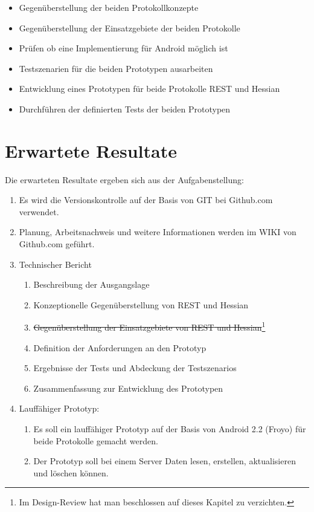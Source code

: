 \documentclass[abstracton, listof=totocnumbered,
bibliography=totocnumbered]{scrreprt}
\begin{document}
  \begin{itemize}
    \item Gegenüberstellung der beiden Protokollkonzepte
    \item Gegenüberstellung der Einsatzgebiete der beiden Protokolle
    \item Prüfen ob eine Implementierung für Android möglich ist
    \item Testszenarien für die beiden Prototypen ausarbeiten
    \item Entwicklung eines Prototypen für beide Protokolle \ac{REST} und
          Hessian
    \item Durchführen der definierten Tests der beiden Prototypen
  \end{itemize}
  
  \section{Erwartete Resultate}
  Die erwarteten Resultate ergeben sich aus der Aufgabenstellung:
  
  \begin{enumerate}
    \item Es wird die Versionskontrolle auf der Basis von GIT bei
          Github.com verwendet.
    \item Planung, Arbeitsnachweis und weitere Informationen werden im WIKI
          von Github.com geführt.
    \item Technischer Bericht
    \begin{enumerate}
      \item Beschreibung der Ausgangslage
      \item Konzeptionelle Gegenüberstellung von \ac{REST} und Hessian
      \item \sout{Gegenüberstellung der Einsatzgebiete von \ac{REST} und
      Hessian}\footnote[4]{
        Im Design-Review hat man beschlossen auf dieses Kapitel zu verzichten.}
      \item Definition der Anforderungen an den Prototyp 
      \item Ergebnisse der Tests und Abdeckung der Testszenarios
      \item Zusammenfassung zur Entwicklung des Prototypen
    \end{enumerate}
    \item Lauffähiger Prototyp:
    \begin{enumerate}
      \item Es soll ein lauffähiger Prototyp auf der Basis von
            Android 2.2 (Froyo) für beide Protokolle gemacht werden.
      \item Der Prototyp soll bei einem Server Daten lesen, erstellen,
            aktualisieren und löschen können.
    \end{enumerate}
  \end{enumerate}
  
\end{document}

